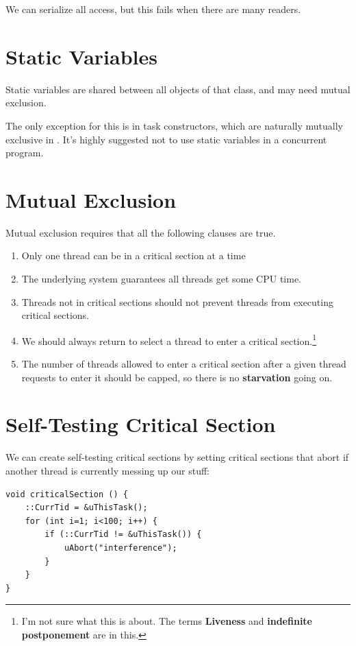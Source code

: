             We can serialize all access, but this fails when there are many readers.
        \section{Static Variables} %
        \label{sec:static_variables}
            Static variables are shared between all objects of that class, and may need mutual exclusion.

            The only exception for this is in task constructors, which are naturally mutually exclusive in \uC.
            It's highly suggested not to use static variables in a concurrent program.
        \section{Mutual Exclusion} %
        \label{sec:mutual_exclusion}
            Mutual exclusion requires that all the following clauses are true.
            \begin{enumerate}
                \item Only one thread can be in a critical section at a time
                \item The underlying system guarantees all threads get some CPU time.
                \item Threads not in critical sections should not prevent threads from executing critical sections.
                \item We should always return to select a thread to enter a critical section.\footnote{I'm not sure what this is about. The terms \textbf{Liveness} and \textbf{indefinite postponement} are in this.}
                \item The number of threads allowed to enter a critical section after a given thread requests to enter it should be capped, so there is no \textbf{starvation} going on.
            \end{enumerate}
        \section{Self-Testing Critical Section} %
        \label{sec:self_testing_critical_section}
            We can create self-testing critical sections by setting critical sections that abort if another thread is currently messing up our stuff:
                \begin{lstlisting}
void criticalSection () {
    ::CurrTid = &uThisTask();
    for (int i=1; i<100; i++) {
        if (::CurrTid != &uThisTask()) {
            uAbort("interference");
        }
    }
}
                \end{lstlisting}
